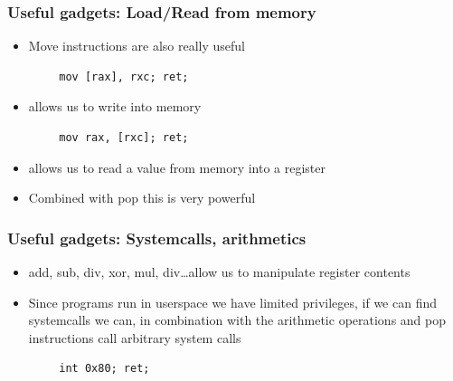 \documentclass[11pt]{beamer}
\begin{document}
\begin{frame}[fragile]
    \frametitle{Useful gadgets: Load/Read from memory}
    \begin{itemize}
        \item Move instructions are also really useful
    \end{itemize}
    \begin{Verbatim}
        mov [rax], rxc; ret;
    \end{Verbatim}
    \begin{itemize}
        \item allows us to write into memory
    \end{itemize}
    \begin{Verbatim}
        mov rax, [rxc]; ret;
    \end{Verbatim}
    \begin{itemize}
        \item allows us to read a value from memory into a register
        \item Combined with pop this is very powerful
    \end{itemize}
\end{frame}

\begin{frame}[fragile]
    \frametitle{Useful gadgets: Systemcalls, arithmetics}
    \begin{itemize}
        \item add, sub, div, xor, mul, div\ldots allow us to manipulate register contents
        \item Since programs run in userspace we have limited privileges, if we can find systemcalls we can, in combination with the arithmetic operations and pop instructions call arbitrary system calls
    \end{itemize}
    \begin{Verbatim}
        int 0x80; ret;
    \end{Verbatim}
\end{frame}
\end{document}
